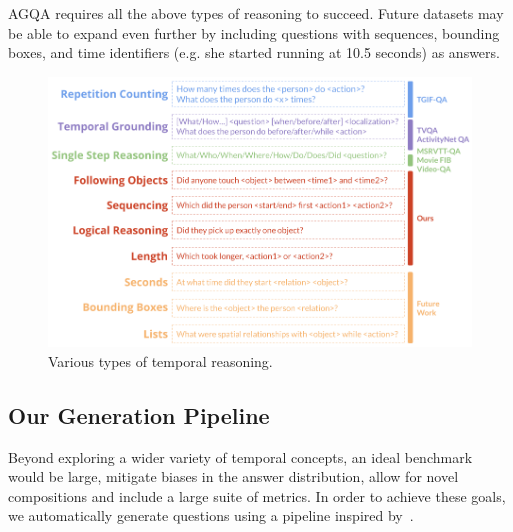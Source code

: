 \documentclass[10pt,twocolumn,letterpaper]{article}
\newcommand{\mgm}[1]{{\color{cyan}{mgm: #1}}}
\begin{document}

 
AGQA requires all the above types of reasoning to succeed. Future datasets may be able to expand even further by including questions with sequences, bounding boxes, and time identifiers (e.g. she started running at 10.5 seconds) as answers.

\begin{figure}[t]
\begin{center}
\includegraphics[width=0.8\linewidth]{Figures/figure_temporalTypes.png}
\end{center}
   \caption{Various types of temporal reasoning.}
\label{temporal_types}
\end{figure}


\subsection{Our Generation Pipeline}
Beyond exploring a wider variety of temporal concepts, an ideal benchmark would be large, mitigate biases in the answer distribution, allow for novel compositions and include a large suite of metrics. In order to achieve these goals, we automatically generate questions using a pipeline inspired by~\cite{hudson2019gqa}.
\end{document}
